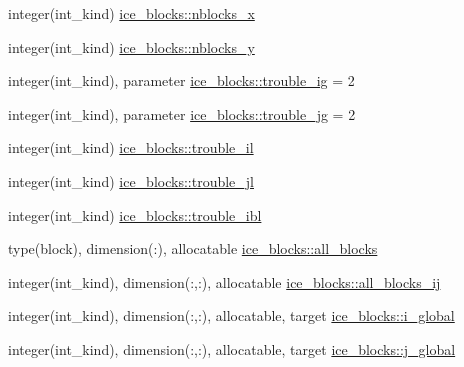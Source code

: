 \begin{DoxyCompactItemize}
\item 
integer(int\_\-kind) \hyperlink{namespaceice__blocks_a9b21bc42a54bcb4a87b28e91dcd90868}{ice\_\-blocks::nblocks\_\-x}
\item 
integer(int\_\-kind) \hyperlink{namespaceice__blocks_ab17b5f72b3e734e10c8e896fff833b5c}{ice\_\-blocks::nblocks\_\-y}
\item 
integer(int\_\-kind), parameter \hyperlink{namespaceice__blocks_a28a352083c6fc77c5dc4ba8acb9a1eb5}{ice\_\-blocks::trouble\_\-ig} = 2
\item 
integer(int\_\-kind), parameter \hyperlink{namespaceice__blocks_a508d64694caacafbc0b551ebd1340c4a}{ice\_\-blocks::trouble\_\-jg} = 2
\item 
integer(int\_\-kind) \hyperlink{namespaceice__blocks_a8da713bec362fba640a38ca450162cfd}{ice\_\-blocks::trouble\_\-il}
\item 
integer(int\_\-kind) \hyperlink{namespaceice__blocks_a50ca28a3bb76af2138eaf1bcedbd277f}{ice\_\-blocks::trouble\_\-jl}
\item 
integer(int\_\-kind) \hyperlink{namespaceice__blocks_a10098396d200773e0d7ebe723e6226e5}{ice\_\-blocks::trouble\_\-ibl}
\item 
type(block), dimension(:), allocatable \hyperlink{namespaceice__blocks_a29dbac203a4f7066fd7d3774c79cb455}{ice\_\-blocks::all\_\-blocks}
\item 
integer(int\_\-kind), dimension(:,:), allocatable \hyperlink{namespaceice__blocks_a688487df478314a2bfdd431e7fd741f2}{ice\_\-blocks::all\_\-blocks\_\-ij}
\item 
integer(int\_\-kind), dimension(:,:), allocatable, target \hyperlink{namespaceice__blocks_a5a6a14070030778ba9fcbcaa8dc2fb0d}{ice\_\-blocks::i\_\-global}
\item 
integer(int\_\-kind), dimension(:,:), allocatable, target \hyperlink{namespaceice__blocks_aabcbed07b689eed9c35b22f738006217}{ice\_\-blocks::j\_\-global}
\end{DoxyCompactItemize}
